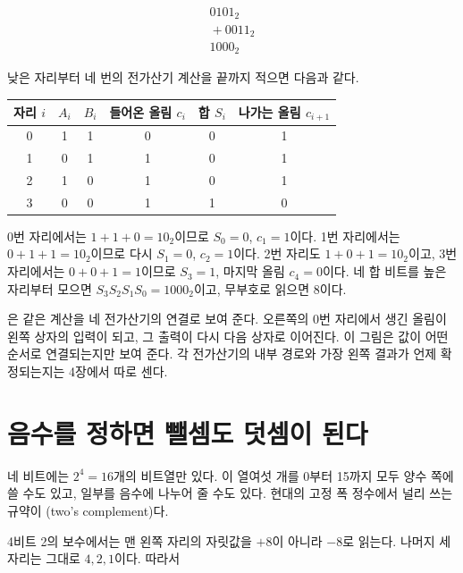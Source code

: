 \[
\begin{array}{r}
  0101_2\\[-1mm]
{}+0011_2\\
\hline
  1000_2
\end{array}
\]

낮은 자리부터 네 번의 전가산기 계산을 끝까지 적으면 다음과 같다.

\begin{center}
\small
\begin{tabular}{cccccc}
\toprule
\sffamily\bfseries 자리 \(i\) & \sffamily\bfseries \(A_i\) & \sffamily\bfseries \(B_i\) & \sffamily\bfseries 들어온 올림 \(c_i\) & \sffamily\bfseries 합 \(S_i\) & \sffamily\bfseries 나가는 올림 \(c_{i+1}\) \\
\midrule
0 & 1 & 1 & 0 & 0 & 1 \\
1 & 0 & 1 & 1 & 0 & 1 \\
2 & 1 & 0 & 1 & 0 & 1 \\
3 & 0 & 0 & 1 & 1 & 0 \\
\bottomrule
\end{tabular}
\end{center}

0번 자리에서는 \(1+1+0=10_2\)이므로 \(S_0=0\), \(c_1=1\)이다. 1번 자리에서는 \(0+1+1=10_2\)이므로 다시 \(S_1=0\), \(c_2=1\)이다. 2번 자리도 \(1+0+1=10_2\)이고, 3번 자리에서는 \(0+0+1=1\)이므로 \(S_3=1\), 마지막 올림 \(c_4=0\)이다. 네 합 비트를 높은 자리부터 모으면 \(S_3S_2S_1S_0=1000_2\)이고, 무부호로 읽으면 8이다.



은 같은 계산을 네 전가산기의 연결로 보여 준다. 오른쪽의 0번 자리에서 생긴 올림이 왼쪽 상자의 입력이 되고, 그 출력이 다시 다음 상자로 이어진다. 이 그림은 값이 어떤 순서로 연결되는지만 보여 준다. 각 전가산기의 내부 경로와 가장 왼쪽 결과가 언제 확정되는지는 4장에서 따로 센다.

\section{음수를 정하면 뺄셈도 덧셈이 된다}

네 비트에는 \(2^4=16\)개의 비트열만 있다. 이 열여섯 개를 0부터 15까지 모두 양수 쪽에 쓸 수도 있고, 일부를 음수에 나누어 줄 수도 있다. 현대의 고정 폭 정수에서 널리 쓰는 규약이 (two's complement)다\parencite{mit6004information}.

4비트 2의 보수에서는 맨 왼쪽 자리의 자릿값을 \(+8\)이 아니라 \(-8\)로 읽는다. 나머지 세 자리는 그대로 \(4,2,1\)이다. 따라서

